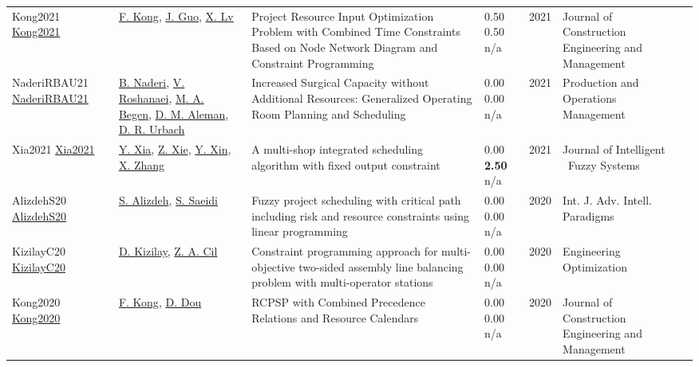 {\begin{longtable}{p{3cm}p{5cm}p{10cm}p{1cm}rp{2.5cm}l}
Kong2021 \href{http://dx.doi.org/10.1061/(asce)co.1943-7862.0002192}{Kong2021} & \hyperref[auth:a1704]{F. Kong}, \hyperref[auth:a1705]{J. Guo}, \hyperref[auth:a1706]{X. Lv} & Project Resource Input Optimization Problem with Combined Time Constraints Based on Node Network Diagram and Constraint Programming & \noindent{}0.50 0.50 n/a & 2021 & Journal of Construction Engineering and Management & \cite{Kong2021}\\
NaderiRBAU21 \href{http://dx.doi.org/10.1111/poms.13397}{NaderiRBAU21} & \hyperref[auth:a725]{B. Naderi}, \hyperref[auth:a727]{V. Roshanaei}, \hyperref[auth:a835]{M. A. Begen}, \hyperref[auth:a894]{D. M. Aleman}, \hyperref[auth:a895]{D. R. Urbach} & Increased Surgical Capacity without Additional Resources: Generalized Operating Room Planning and Scheduling & \noindent{}\textcolor{black!50}{0.00} \textcolor{black!50}{0.00} n/a & 2021 & \cellcolor{red!20}Production and Operations Management & \cite{NaderiRBAU21}\\
Xia2021 \href{http://dx.doi.org/10.3233/jifs-189721}{Xia2021} & \hyperref[auth:a1538]{Y. Xia}, \hyperref[auth:a1539]{Z. Xie}, \hyperref[auth:a1540]{Y. Xin}, \hyperref[auth:a1541]{X. Zhang} & A multi-shop integrated scheduling algorithm with fixed output constraint & \noindent{}\textcolor{black!50}{0.00} \textbf{2.50} n/a & 2021 & Journal of Intelligent \  Fuzzy Systems & \cite{Xia2021}\\
AlizdehS20 \href{https://doi.org/10.1504/IJAIP.2020.106687}{AlizdehS20} & \hyperref[auth:a512]{S. Alizdeh}, \hyperref[auth:a513]{S. Saeidi} & Fuzzy project scheduling with critical path including risk and resource constraints using linear programming & \noindent{}\textcolor{black!50}{0.00} \textcolor{black!50}{0.00} n/a & 2020 & \cellcolor{red!20}Int. J. Adv. Intell. Paradigms & \cite{AlizdehS20}\\
KizilayC20 \href{http://dx.doi.org/10.1080/0305215x.2020.1786081}{KizilayC20} & \hyperref[auth:a1379]{D. Kizilay}, \hyperref[auth:a1380]{Z. A. Cil} & Constraint programming approach for multi-objective two-sided assembly line balancing problem with multi-operator stations & \noindent{}\textcolor{black!50}{0.00} \textcolor{black!50}{0.00} n/a & 2020 & \cellcolor{red!20}Engineering Optimization & \cite{KizilayC20}\\
Kong2020 \href{http://dx.doi.org/10.1061/(asce)co.1943-7862.0001929}{Kong2020} & \hyperref[auth:a1704]{F. Kong}, \hyperref[auth:a1777]{D. Dou} & RCPSP with Combined Precedence Relations and Resource Calendars & \noindent{}\textcolor{black!50}{0.00} \textcolor{black!50}{0.00} n/a & 2020 & Journal of Construction Engineering and Management & \cite{Kong2020}\\

\end{longtable}}
